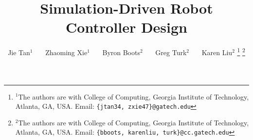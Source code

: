 \documentclass[letterpaper, 10 pt, conference]{ieeeconf}  %
\title{\LARGE \bf
Simulation-Driven Robot Controller Design
}
\author{Jie Tan$^{1}$ ~~~Zhaoming Xie$^{1}$ ~~~Byron Boots$^{2}$ ~~~Greg Turk$^{2}$ ~~~Karen Liu$^{2}$%
\thanks{$^{1}$The authors are with College of Computing, Georgia Institute of Technology, Atlanta, GA, USA. Email:
        {\tt\small \{jtan34, zxie47\}@gatech.edu}}%
\thanks{$^{2}$The authors are with College of Computing, Georgia Institute of Technology, Atlanta, GA, USA. Email:
        {\tt\small \{bboots, karenliu, turk\}@cc.gatech.edu}}%
}
\begin{document}
\maketitle
\thispagestyle{empty}
\pagestyle{empty}


\begin{abstract}

\end{abstract}











\end{document}
